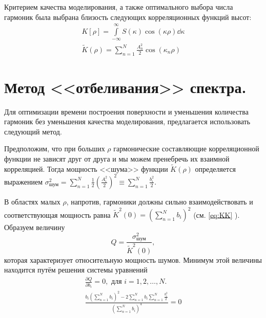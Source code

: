 \documentclass[a4paper,14pt]{extarticle}
\newcommand{\tK}{\widetilde K}
\renewcommand{\qty}{ }
\begin{document}




Критерием качества моделирования, а также оптимального выбора числа гармоник
была выбрана близость следующих корреляционных функций высот:
\begin{gather}
    \label{eq:KK}
    K[\rho] = \int\limits_{-\infty}^{\infty} S(\kappa) \cos(\kappa\rho) \dd \kappa\\
    \tK(\rho) = \sum\limits_{n=1}^{N} \frac{A_n^2}{2} \cos(\kappa_n \rho)
\end{gather}

\section{Метод <<отбеливания>> спектра.}%
\label{sec:metod_otbelivaniia_spektra_}

Для оптимизации времени построения поверхности и уменьшения количества гармоник
без уменьшения качества моделирования, предлагается использовать следующий
метод.

Предположим, что при больших $\rho$ гармонические составляющие корреляционной
функции не зависят друг от друга и мы можем пренебречь их взаимной корреляцией.
Тогда мощность <<шума>> функции $\tK (\rho)$ определяется выражением
$\displaystyle \sigma^2_{\text{шум}} = \sum\limits_{n=1}^{N} \frac{1}{2}
\qty ( \frac{A^2_i}{2} )^2 \equiv \sum\limits_{n=1}^{N} \frac{b_i^2}{2}$.

В областях малых $\rho$, напротив, гармоники должны сильно взаимодействовать и
соответствующая мощность равна  $\tK^2(0) =
\qty(\sum\limits_{n=1}^{N} b_i)^2$ (см. \eqref{eq:KK} ).
Образуем величину
\begin{equation}
    \label{eq:Q}
    Q = \frac{\sigma_{\text{шум}}^2}{\tK^2(0)},
\end{equation}
которая характеризует относительную мощность шумов. Минимум этой величины
находится путём решения системы уравнений
\begin{gather}
    \frac{\partial Q}{\partial b_i} = 0, \text{ для } i=1,2,\dots, N. \\
    \frac{b_i \qty( \sum\limits_{n=1}^{N} b_i )^2 - 2 \sum\limits_{n=1}^{N} b_i
    \sum\limits_{n=1}^{N}  \frac{b_i^2}{2}}{\qty(\sum\limits_{n=1}^{N}
b_i)^4}=0
\end{gather}
\end{document}
